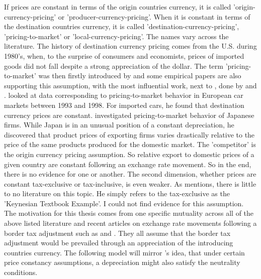 If prices are constant in terms of the origin countries currency, it is called 'origin-currency-pricing' or 'producer-currency-pricing'. When it is constant in terms of the destination countries currency, it is called 'destination-currency-pricing', 'pricing-to-market' or 'local-currency-pricing'. The names vary across the literature. The history of destination currency pricing comes from the U.S. during 1980's, when, to the surprise of consumers and economists, prices of imported goods did not fall despite a strong appreciation of the dollar. The term 'pricing-to-market' was then firstly introduced by \cite{krugman1986pricing} and some empirical papers are also supporting this assumption, with the most influential work, next to \cite{krugman1986pricing}, done by \cite{gil2002export} and \cite{marston1990pricing}. \cite{gil2002export} looked at data corresponding to pricing-to-market behavior in European car markets between 1993 and 1998. For imported cars, he found that destination currency prices are constant. \cite{marston1990pricing} investigated pricing-to-market behavior of Japanese firms. While Japan is in an unusual position of a constant depreciation, he discovered that product prices of exporting firms varies drastically relative to the price of the same products produced for the domestic market. The 'competitor' is the origin currency pricing assumption. So relative export to domestic prices of a given country are constant following an exchange rate movement. So in the end, there is no evidence for one or another. The second dimension, whether prices are constant tax-exclusive or tax-inclusive, is even weaker. As \cite{buiter2017exchange} mentions, there is little to no literature on this topic. He simply refers to the tax-exclusive as the 'Keynesian Textbook Example'. I could not find evidence for this assumption. \\ 

The motivation for this thesis comes from one specific mutuality across all of the above listed literature and recent articles on exchange rate movements following a border tax adjustment such as \cite{feldstein2017house} and \cite{auerbach2017destination}. They all assume that the border tax adjustment would be prevailed through an appreciation of the introducing countries currency. The following model will mirror \cite{buiter2017exchange}'s idea, that under certain price constancy assumptions, a depreciation might also satisfy the neutrality conditions. 


